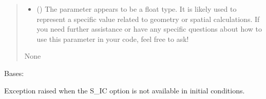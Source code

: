 \documentclass[a4paper,11pt,english,openany]{sphinxmanual}
\begin{document}
\begin{fulllineitems}
\begin{fulllineitems}
\begin{quote}
\begin{description}
\begin{itemize}
\item {} 
\sphinxAtStartPar
{} () \textendash{} The parameter  appears to be a float type. It is likely used to represent a specific value related to geometry or spatial calculations. If you need further assistance or have any specific questions about how to use this parameter in your code, feel free to ask!

\end{itemize}

\sphinxAtStartPar
None

\end{description}\end{quote}

\end{fulllineitems}


\end{fulllineitems}


\sphinxstepscope
{}\label{\detokenize{api/spyice.preprocess.initial_boundary_conditions:module-spyice.preprocess.initial_boundary_conditions}}

\begin{fulllineitems}
\label{\detokenize{api/spyice.preprocess.initial_boundary_conditions:spyice.preprocess.initial_boundary_conditions.SalinityUnavailableError}}
\pysigstartsignatures
{}
\pysigstopsignatures
\sphinxAtStartPar
Bases: 

\sphinxAtStartPar
Exception raised when the S\_IC option is not available in initial conditions.

\end{fulllineitems}

\end{document}
